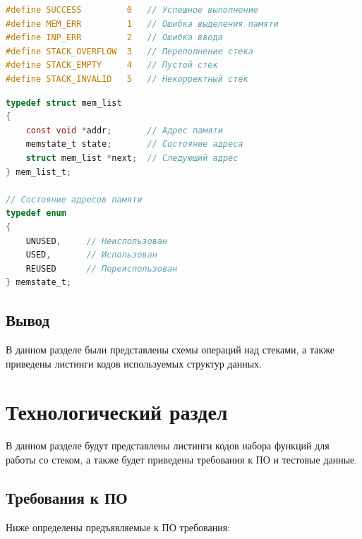 \begin{lstlisting}[language=C,caption=Коды ошибок]
#define SUCCESS         0   // Успешное выполнение
#define MEM_ERR         1   // Ошибка выделения памяти
#define INP_ERR         2   // Ошибка ввода
#define STACK_OVERFLOW  3   // Переполнение стека
#define STACK_EMPTY     4   // Пустой стек
#define STACK_INVALID   5   // Некорректный стек
\end{lstlisting}

\begin{lstlisting}[language=C,caption=Список адресов памяти для стека реализованного списком]
typedef struct mem_list
{
	const void *addr;       // Адрес памяти
	memstate_t state;       // Состояние адреса
	struct mem_list *next;  // Следующий адрес
} mem_list_t;

// Состояние адресов памяти
typedef enum
{
	UNUSED,     // Неиспользован
	USED,       // Использован
	REUSED      // Переиспользован
} memstate_t;
\end{lstlisting}

\section{Вывод}

В данном разделе были представлены схемы операций над стеками, а также приведены листинги кодов используемых структур данных.

\chapter{Технологический раздел}

В данном разделе будут представлены листинги кодов набора функций для работы со стеком, а также будет приведены требования к ПО и тестовые данные.

\section{Требования к ПО}

Ниже определены предъявляемые к ПО требования:

